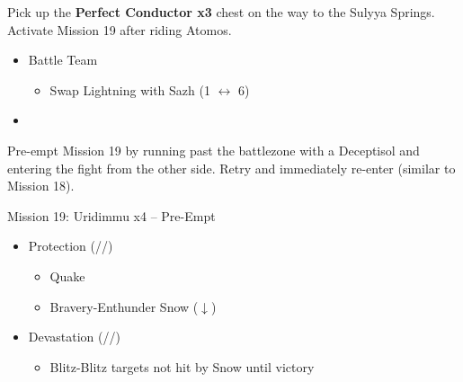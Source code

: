 Pick up the \textbf{Perfect Conductor x3} chest on the way to the Sulyya Springs.
Activate Mission 19 after riding Atomos.

\begin{menu}
	\begin{itemize}
		\paradigm
		\begin{itemize}
			\item Battle Team
				\begin{itemize}
					\item Swap Lightning with Sazh (1 $\leftrightarrow$ 6)
				\end{itemize}
			\item {}%
				  {\paradigmline{\com}{(\sab)}{\sen}}%
			      {\paradigmline{\com}{\rav}{\rav}}%
			      {\paradigmline[4]{\syn}{\med}{\sen}}%
			      {\paradigmline{\com}{[\sab]}{(\com)}}%
			      {\paradigmline{[\rav]}{(\sab)}{(\sen)}}%
			      {\paradigmline{\com}{\med}{[\com]}}%
		\end{itemize}
	\end{itemize}
\end{menu}

\renewcommand{\first}{[1] Dirty Fighting (\com/\sab/\sen)}
\renewcommand{\third}{[3] Protection (\syn/\med/\sen)}
\renewcommand{\fourth}{[4] Devastation (\com/\sab/\com)}
\renewcommand{\fifth}{[5] Matador (\rav/\sab/\sen)}

Pre-empt Mission 19 by running past the battlezone with a Deceptisol and entering the fight from the other side.
Retry and immediately re-enter (similar to Mission 18).

\begin{battle}{Mission 19: Uridimmu x4 -- Pre-Empt}
	\begin{itemize}
		\item \third
			\begin{itemize}
				\item Quake
				\item Bravery-Enthunder Snow ($\downarrow$)
			\end{itemize}
		\item \fourth
			\begin{itemize}
				\item Blitz-Blitz targets not hit by Snow until victory
			\end{itemize}
	\end{itemize}
\end{battle}
